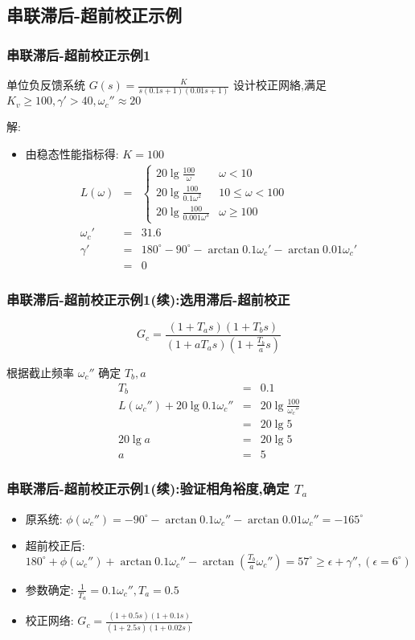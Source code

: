 \documentclass[table]{beamer}
\begin{document}
\subsection{串联滞后-超前校正示例}
\label{sec-4-2}
\begin{frame}
\frametitle{串联滞后-超前校正示例1}
\label{sec-4-2-1}

单位负反馈系统  $G(s)=\frac{K}{s(0.1s+1)(0.01s+1)}$  设计校正网絡,满足  $K_v \geq 100,\gamma'>40,\omega_c''\approx 20$ 

解:
\begin{itemize}
\item <2->由稳态性能指标得:  $K=100$ 
      \begin{eqnarray*}
      L(\omega) & = &\begin{cases}20\lg\frac{100}{\omega} & \omega<10 \\
                                  20\lg\frac{100}{0.1\omega^2} & 10\leq \omega<100 \\
                                  20\lg\frac{100}{0.001\omega^3} & \omega \geq 100 \end{cases} \\
      \omega_c' &=& 31.6 \\
      \gamma' &=& 180^{\circ}-90^{\circ}-\arctan0.1\omega_c'-\arctan0.01\omega_c' \\
       &=& 0 
      \end{eqnarray*}
\end{itemize}
\end{frame}
\begin{frame}
\frametitle{串联滞后-超前校正示例1(续):选用滞后-超前校正}
\label{sec-4-2-2}


\[G_c = \frac{(1+T_a s)(1+T_b s)}{(1+aT_a s)(1+\frac{T_b}{a}s)}\]

根据截止频率  $\omega_c''$  确定  $T_b,a$ 
\begin{eqnarray*}
T_b & = & 0.1\\
L(\omega_c'') +20\lg0.1\omega_c'' &=& 20\lg\frac{100}{\omega_c''} \\
&=& 20\lg5\\
20\lg a &=& 20\lg5 \\
a &=& 5 
\end{eqnarray*}
\end{frame}
\begin{frame}
\frametitle{串联滞后-超前校正示例1(续):验证相角裕度,确定 $T_{a}$}
\label{sec-4-2-3}

\begin{itemize}
\item 原系统: $\phi(\omega_c'') = -90^{\circ}-\arctan 0.1\omega_c''-\arctan 0.01\omega_c''=-165^{\circ}$
\item 超前校正后: 
       $180^{\circ}+\phi(\omega_c'')+\arctan0.1\omega_c''-\arctan(\frac{T_b}{a}\omega_c'')= 57^{\circ}\geq\epsilon+\gamma'',(\epsilon=6^{\circ})$
\item 参数确定: $\frac{1}{T_a} =0.1\omega_c'',T_a = 0.5$
\item 校正网络: 
       	$G_c=\frac{(1+0.5s)(1+0.1s)}{(1+2.5s)(1+0.02s)}$
\end{itemize}
\end{frame}
\end{document}
